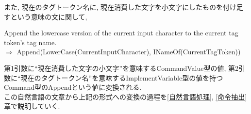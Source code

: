 \documentclass[uplatex,a4j]{jsreport}
\begin{document}
また, 現在のタグトークン名に, 現在消費した文字を小文字にしたものを付け足すという意味の文に関して, 

Append the lowercase version of the current input character to the current tag token's tag name.\\
$\Rightarrow$ Append(LowerCase(CurrentInputCharacter), INameOf(CurrentTagToken))

第1引数に``現在消費した文字の小文字''を意味するCommandValue型の値, 第2引数に``現在のタグトークン名''を意味するImplementVariable型の値を持つCommand型のAppendという値に変換される.\\

この自然言語の文章から上記の形式への変換の過程を\ref{自然言語処理}, \ref{命令抽出}章で説明していく.\\
\end{document}
